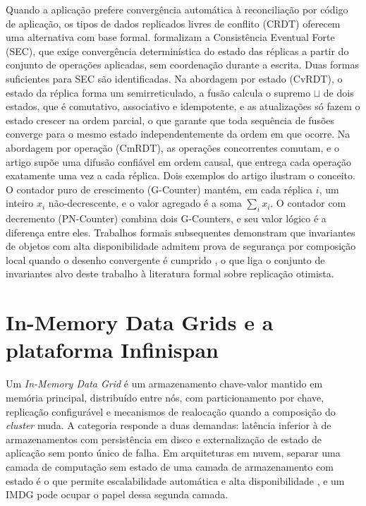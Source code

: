 Quando a aplicação prefere convergência automática à reconciliação por código de aplicação, os tipos de dados replicados livres de conflito (CRDT) oferecem uma alternativa com base formal. \citet{shapiro_crdt_2011} formalizam a Consistência Eventual Forte (SEC), que exige convergência determinística do estado das réplicas a partir do conjunto de operações aplicadas, sem coordenação durante a escrita. Duas formas suficientes para SEC são identificadas. Na abordagem por estado (CvRDT), o estado da réplica forma um semirreticulado, a fusão calcula o supremo $\sqcup$ de dois estados, que é comutativo, associativo e idempotente, e as atualizações só fazem o estado crescer na ordem parcial, o que garante que toda sequência de fusões converge para o mesmo estado independentemente da ordem em que ocorre. Na abordagem por operação (CmRDT), as operações concorrentes comutam, e o artigo supõe uma difusão confiável em ordem causal, que entrega cada operação exatamente uma vez a cada réplica. Dois exemplos do artigo ilustram o conceito. O contador puro de crescimento (G-Counter) mantém, em cada réplica $i$, um inteiro $x_i$ não-decrescente, e o valor agregado é a soma $\sum_i x_i$. O contador com decremento (PN-Counter) combina dois G-Counters, e seu valor lógico é a diferença entre eles. Trabalhos formais subsequentes demonstram que invariantes de objetos com alta disponibilidade admitem prova de segurança por composição local quando o desenho convergente é cumprido \citep{nair_safety_distributed_2020}, o que liga o conjunto de invariantes alvo deste trabalho à literatura formal sobre replicação otimista.

\section{In-Memory Data Grids e a plataforma Infinispan}
\label{sec-fund-imdg}

Um \emph{In-Memory Data Grid} é um armazenamento chave-valor mantido em memória principal, distribuído entre nós, com particionamento por chave, replicação configurável e mecanismos de realocação quando a composição do \emph{cluster} muda. A categoria responde a duas demandas: latência inferior à de armazenamentos com persistência em disco e externalização de estado de aplicação sem ponto único de falha. Em arquiteturas em nuvem, separar uma camada de computação sem estado de uma camada de armazenamento com estado é o que permite escalabilidade automática e alta disponibilidade \citep{armbrust_cloud_2010}, e um IMDG pode ocupar o papel dessa segunda camada.

